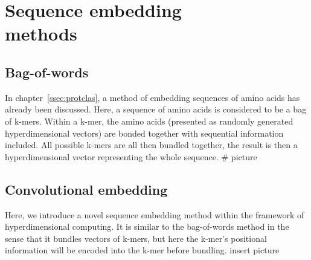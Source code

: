 \chapter[Sequence embedding methods]{Sequence embedding\\methods}

\section{Bag-of-words}
In chapter~\ref{ssec:protclas}, a method of embedding sequences of amino acids has already been discussed. Here, a sequence of amino acids is considered to be a bag of k-mers. Within a k-mer, the amino acids (presented as randomly generated hyperdimensional vectors) are bonded together with sequential information included. All possible k-mers are all then bundled together, the result is then a hyperdimensional vector representing the whole sequence.
\# picture

\section{Convolutional embedding}
Here, we introduce a novel sequence embedding method within the framework of hyperdimensional computing. It is similar to the bag-of-words method in the sense that it bundles vectors of k-mers, but here the k-mer's positional information will be encoded into the k-mer before bundling. insert picture

